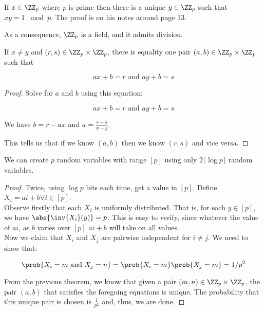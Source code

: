 \documentclass[../main.tex]{subfiles}
\begin{document}
\begin{lemma}
    If $x \in \ZZ_{p}$ where $p$ is prime then there is a unique $y \in \ZZ_{p}$ such that $xy = 1 \mod p$. The proof is on his notes around page 13.
\end{lemma}

\begin{remark}
    As a consequence, $\ZZ_{p}$ is a field, and it admits division.
\end{remark}

\begin{lemma}
    If $x \not = y$ and $(r,s) \in \ZZ_p \times \ZZ_p$, there is equality one pair $(a,b) \in \ZZ_p \times \ZZ_p$ such that

    \[
        ax + b = r \text{ and } ay + b = s
    \]

\end{lemma}

\begin{proof}
    Solve for $a$ and $b$ using this equation:

    \[
        ax + b = r \text{ and } ay + b = s
    \]

    We have $b = r - ax$ and $a = \frac{r - s}{x - y}$.

    This tells us that if we know $(a,b)$ then we know $(r,s)$ and
    vice versa.
\end{proof}

\begin{theorem}
    We can create $p$ random variables with range $[p]$ using
    only $2 \lceil \log p \rceil$ random variables.
\end{theorem}

\begin{proof}
    Twice, using $\log p$ bits each time, get a value in $[p]$. Define $X_{i} = ai + b \forall i \in [p]$. \\

    Observe firstly that each $X_{i}$ is uniformly distributed. That is, for each $y \in [p]$, we have $\abs{\inv{X_{i}}(y)} = p$. This is easy to verify, since whatever the value of $ai$, as $b$ varies over $[p]$ $ai + b$ will take on all values. \\

    Now we claim that $X_{i}$ and $X_{j}$ are pairwise independent for $i \not = j$. We need to show that:

    \[
        \prob{X_{i} = m \text{ and } X_{j} = n} = \prob{X_{i} = m}\prob{X_{j} = m} = 1/p^2
    \]

    From the previous theorem, we know that given a pair $(m,n) \in \ZZ_p \times \ZZ_p$, the pair $(a,b)$ that satisfies the foregoing equations is unique. The probability that this unique pair is chosen is $\frac{1}{p^2}$ and, thus, we are done.
\end{proof}
\end{document}
